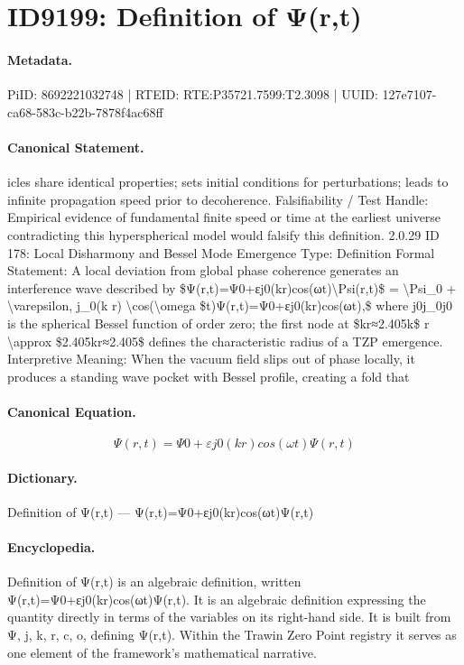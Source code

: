 \section*{ID9199: Definition of Ψ(r,t)}
\paragraph{Metadata.}
PiID: 8692221032748 | RTEID: RTE:P35721.7599:T2.3098 | UUID: 127e7107-ca68-583c-b22b-7878f4ac68ff

\paragraph{Canonical Statement.}
icles share identical properties; sets initial conditions for perturbations; leads to infinite propagation speed prior to decoherence. Falsifiability / Test Handle: Empirical evidence of fundamental finite speed or time at the earliest universe contradicting this hyperspherical model would falsify this definition. 2.0.29 ID 178: Local Disharmony and Bessel Mode Emergence Type: Definition Formal Statement: A local deviation from global phase coherence generates an interference wave described by \$Ψ(r,t)=Ψ0+εj0(kr)cos(ωt)\textbackslash{}Psi(r,t)\$ = \textbackslash{}Psi\_0 + \textbackslash{}varepsilon, j\_0(k r) \textbackslash{}cos(\textbackslash{}omega \$t)Ψ(r,t)=Ψ0+εj0(kr)cos(ωt),\$ where j0j\_0j0 is the spherical Bessel function of order zero; the first node at \$kr≈2.405k\$ r \textbackslash{}approx \$2.405kr≈2.405\$ defines the characteristic radius of a TZP emergence. Interpretive Meaning: When the vacuum field slips out of phase locally, it produces a standing wave pocket with Bessel profile, creating a fold that

\paragraph{Canonical Equation.}
\[
Ψ(r,t)=Ψ0+εj0(kr)cos(ωt)\Psi(r,t)
\]

\paragraph{Dictionary.}
Definition of Ψ(r,t) — Ψ(r,t)=Ψ0+εj0(kr)cos(ωt)Ψ(r,t)

\paragraph{Encyclopedia.}
Definition of Ψ(r,t) is an algebraic definition, written Ψ(r,t)=Ψ0+εj0(kr)cos(ωt)Ψ(r,t). It is an algebraic definition expressing the quantity directly in terms of the variables on its right-hand side. It is built from Ψ, j, k, r, c, o, defining Ψ(r,t). Within the Trawin Zero Point registry it serves as one element of the framework's mathematical narrative.
